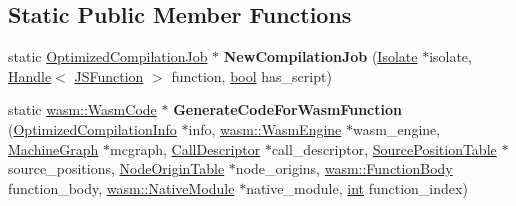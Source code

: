 \subsection*{Static Public Member Functions}
\begin{DoxyCompactItemize}
\item 
\mbox{\label{classv8_1_1internal_1_1compiler_1_1Pipeline_aabca8cd6a91f8c8d6da36a247de313d6}} 
static \mbox{\hyperlink{classv8_1_1internal_1_1OptimizedCompilationJob}{Optimized\+Compilation\+Job}} $\ast$ {\bfseries New\+Compilation\+Job} (\mbox{\hyperlink{classv8_1_1internal_1_1Isolate}{Isolate}} $\ast$isolate, \mbox{\hyperlink{classv8_1_1internal_1_1Handle}{Handle}}$<$ \mbox{\hyperlink{classv8_1_1internal_1_1JSFunction}{J\+S\+Function}} $>$ function, \mbox{\hyperlink{classbool}{bool}} has\+\_\+script)
\item 
\mbox{\label{classv8_1_1internal_1_1compiler_1_1Pipeline_a3e1236bfa191d51c5db6e0e6c1f76e02}} 
static \mbox{\hyperlink{classv8_1_1internal_1_1wasm_1_1WasmCode}{wasm\+::\+Wasm\+Code}} $\ast$ {\bfseries Generate\+Code\+For\+Wasm\+Function} (\mbox{\hyperlink{classv8_1_1internal_1_1OptimizedCompilationInfo}{Optimized\+Compilation\+Info}} $\ast$info, \mbox{\hyperlink{classv8_1_1internal_1_1wasm_1_1WasmEngine}{wasm\+::\+Wasm\+Engine}} $\ast$wasm\+\_\+engine, \mbox{\hyperlink{classv8_1_1internal_1_1compiler_1_1MachineGraph}{Machine\+Graph}} $\ast$mcgraph, \mbox{\hyperlink{classv8_1_1internal_1_1compiler_1_1CallDescriptor}{Call\+Descriptor}} $\ast$call\+\_\+descriptor, \mbox{\hyperlink{classv8_1_1internal_1_1compiler_1_1SourcePositionTable}{Source\+Position\+Table}} $\ast$source\+\_\+positions, \mbox{\hyperlink{classv8_1_1internal_1_1compiler_1_1NodeOriginTable}{Node\+Origin\+Table}} $\ast$node\+\_\+origins, \mbox{\hyperlink{structv8_1_1internal_1_1wasm_1_1FunctionBody}{wasm\+::\+Function\+Body}} function\+\_\+body, \mbox{\hyperlink{classv8_1_1internal_1_1wasm_1_1NativeModule}{wasm\+::\+Native\+Module}} $\ast$native\+\_\+module, \mbox{\hyperlink{classint}{int}} function\+\_\+index)
\item 
\mbox{\label{classv8_1_1internal_1_1compiler_1_1Pipeline_a1eb185c022b5fd6ff0bd57f045e0e40f}} 

\end{DoxyCompactItemize}
